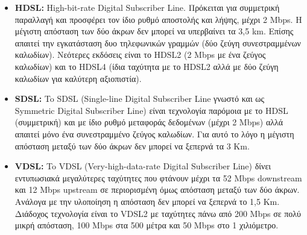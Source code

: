 \begin{itemize}
\item \textbf{HDSL:} High-bit-rate Digital Subscriber Line. Πρόκειται για συμμετρική παραλλαγή και προσφέρει τον ίδιο ρυθμό αποστολής και λήψης, μέχρι 2 Mbps. Η μέγιστη απόσταση των δύο άκρων δεν μπορεί να υπερβαίνει τα 3,5 km. Επίσης απαιτεί την εγκατάσταση δυο τηλεφωνικών γραμμών (δύο ζεύγη συνεστραμμένων καλωδίων). Νεότερες εκδόσεις είναι το HDSL2 (2 Mbps με ένα ζεύγος καλωδίων) και το HDSL4 (ίδια ταχύτητα με το HDSL2 αλλά με δύο ζεύγη καλωδίων για καλύτερη αξιοπιστία).
\item \textbf{SDSL:} To SDSL (Single-line Digital Subscriber Line γνωστό και ως Symmetric Digital Subscriber Line) είναι τεχνολογία παρόμοια με το HDSL (συμμετρική) και με ίδιο ρυθμό μεταφοράς δεδομένων (μέχρι 2 Mbps) αλλά απαιτεί μόνο ένα συνεστραμμένο ζεύγος καλωδίων. Για αυτό το λόγο η μέγιστη απόσταση μεταξύ των δύο άκρων δεν μπορεί να ξεπερνά τα 3 Km.
\item \textbf{VDSL:} To VDSL (Very-high-data-rate Digital Subscriber Line) δίνει εντυπωσιακά μεγαλύτερες ταχύτητες που φτάνουν μέχρι τα 52 Mbps downstream και 12 Mbps upstream σε περιορισμένη όμως απόσταση μεταξύ των δύο άκρων. Ανάλογα με την υλοποίηση η απόσταση δεν μπορεί να ξεπερνά το 1,5 Km. Διάδοχος τεχνολογία είναι το VDSL2 με ταχύτητες πάνω από 200 Mbps σε πολύ μικρή απόσταση, 100 Mbps στα 500 μέτρα και 50 Mbps στο 1 χιλιόμετρο.
\end{itemize}

